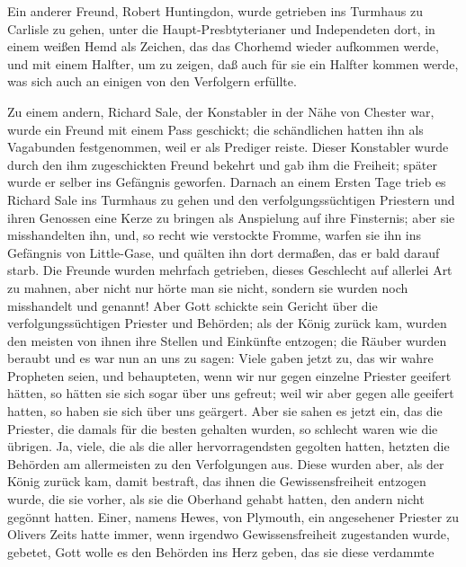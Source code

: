 Ein anderer Freund, Robert Huntingdon, wurde getrieben
ins Turmhaus zu Carlisle zu gehen, unter die 
Haupt-Presbtyterianer
und Independeten dort, in einem weißen Hemd als
Zeichen, das das Chorhemd wieder aufkommen werde, und mit
einem Halfter, um zu zeigen, daß auch für sie ein Halfter kommen
werde, was sich auch an einigen von den Verfolgern erfüllte.

Zu einem andern, Richard Sale, der Konstabler in der Nähe
von Chester war, wurde ein Freund mit einem Pass geschickt;
die schändlichen  hatten ihn als Vagabunden 
festgenommen, weil er als Prediger reiste. Dieser Konstabler wurde
durch den ihm zugeschickten Freund bekehrt und gab ihm die
Freiheit; später wurde er selber ins Gefängnis geworfen. Darnach
an einem Ersten Tage trieb es Richard Sale ins Turmhaus zu
gehen und den verfolgungssüchtigen Priestern und ihren Genossen
eine Kerze zu bringen als Anspielung auf ihre Finsternis; aber
sie misshandelten ihn, und, so recht wie verstockte \glqq Fromme\grqq{}, warfen
sie ihn ins Gefängnis von Little-Gase, 
und quälten ihn dort dermaßen,
das er bald darauf starb. Die Freunde wurden mehrfach getrieben, 
dieses Geschlecht auf allerlei Art zu mahnen, aber nicht
nur hörte man sie nicht, sondern sie wurden noch misshandelt und
 genannt! Aber Gott schickte sein Gericht
über die verfolgungssüchtigen Priester und Behörden; als der
König zurück kam, wurden den meisten von ihnen ihre Stellen und
Einkünfte entzogen; die Räuber wurden beraubt und es war nun
an uns zu sagen:  Viele gaben
jetzt zu, das wir wahre Propheten seien, 
und behaupteten, wenn
wir nur gegen einzelne Priester geeifert hätten, so hätten sie sich
sogar über uns gefreut; weil wir aber gegen alle geeifert hatten,
so haben sie sich über uns geärgert. Aber sie sahen es jetzt ein,
das die Priester, die damals für die besten gehalten wurden, so
schlecht waren wie die übrigen. Ja, viele, die als die aller 
hervorragendsten gegolten hatten, hetzten die Behörden am 
allermeisten zu den Verfolgungen aus. Diese wurden aber, als der
König zurück kam, damit bestraft, das ihnen die Gewissensfreiheit
entzogen wurde, die sie vorher, als sie die Oberhand gehabt hatten,
den andern nicht gegönnt hatten. Einer, namens Hewes, von
Plymouth, ein angesehener Priester zu Olivers Zeits hatte immer,
wenn irgendwo Gewissensfreiheit zugestanden wurde, gebetet, Gott
wolle es den Behörden ins Herz geben, das sie diese verdammte
